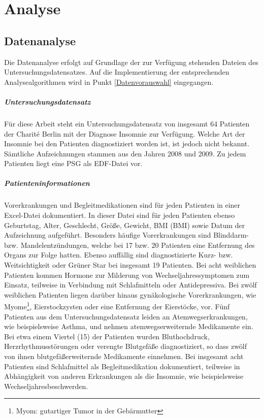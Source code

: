 \chapter{Analyse}

\section{Datenanalyse}\label{datenanalyse}

Die Datenanalyse erfolgt auf Grundlage der zur Verfügung stehenden Dateien des Untersuchungsdatensatzes. Auf die Implementierung der entsprechenden Analysealgorithmen wird in Punkt \ref{Datenvorauswahl} eingegangen.

\paragraph{Untersuchungsdatensatz} Für diese Arbeit steht ein Untersuchungsdatensatz von insgesamt 64 Patienten der Charit\'{e} Berlin mit der Diagnose Insomnie zur Verfügung. Welche Art der Insomnie bei den Patienten diagnostiziert worden ist, ist jedoch nicht bekannt. Sämtliche Aufzeichnungen stammen aus den Jahren 2008 und 2009. Zu jedem Patienten liegt eine \acs{PSG} als \acs{EDF}-Datei vor. 

\paragraph{Patienteninformationen} Vorerkrankungen und Begleitmedikationen sind für jeden Patienten in einer Excel-Datei dokumentiert. In dieser Datei sind für jeden Patienten ebenso Geburtstag, Alter, Geschlecht, Größe, Gewicht, \acl{BMI} (\acs{BMI}) sowie Datum der Aufzeichnung aufgeführt. Besonders häufige Vorerkrankungen sind Blinddarm- bzw. Mandelentzündungen, welche bei 17 bzw. 20 Patienten eine Entfernung des Organs zur Folge hatten. Ebenso auffällig sind diagnostizierte Kurz- bzw. Weitsichtigkeit oder Grüner Star bei insgesamt 19 Patienten. Bei acht weiblichen Patienten kommen Hormone zur Milderung von Wechseljahressymptomen zum Einsatz, teilweise in Verbindung mit Schlafmitteln oder Antidepressiva. Bei zwölf weiblichen Patienten liegen darüber hinaus gynäkologische Vorerkrankungen, wie Myome\footnote{Myom: gutartiger Tumor in der Gebärmutter}, Eierstockzysten oder eine Entfernung der Eierstöcke, vor. Fünf Patienten aus dem Untersuchungsdatensatz leiden an Atemwegserkrankungen, wie beispielsweise Asthma, und nehmen atemwegserweiternde Medikamente ein. Bei etwa einem Viertel (15) der Patienten wurden Bluthochdruck, Herzrhythmusstörungen oder verengte Blutgefäße diagnostiziert, so dass zwölf von ihnen blutgefäßerweiternde Medikamente einnehmen. Bei insgesamt acht Patienten sind Schlafmittel als Begleitmedikation dokumentiert, teilweise in Abhängigkeit von anderen Erkrankungen als die Insomnie, wie beispielsweise Wechseljahresbeschwerden.

